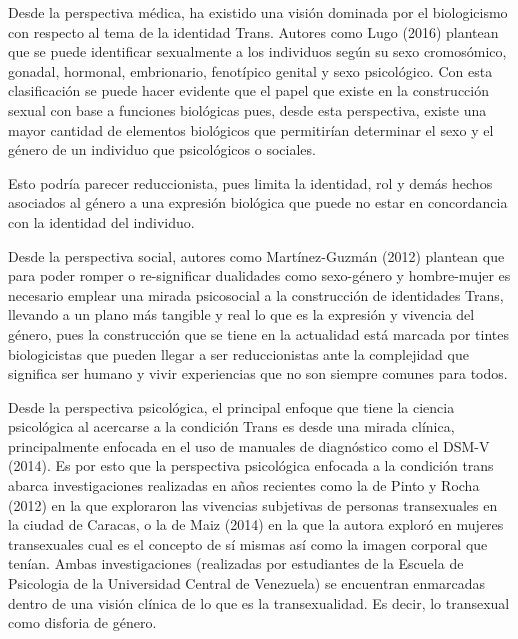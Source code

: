 Desde la perspectiva médica, ha existido una visión dominada por el
biologicismo con respecto al tema de la identidad Trans.
Autores como Lugo (2016) plantean que se puede identificar sexualmente a los
individuos según su sexo cromosómico, gonadal, hormonal, embrionario, fenotípico
genital y sexo psicológico.
Con esta clasificación se puede hacer evidente que el papel que existe en la
construcción sexual con base a funciones biológicas pues, desde esta
perspectiva, existe una mayor cantidad de elementos biológicos que
permitirían determinar el sexo y el género de un individuo que psicológicos o
sociales.

Esto podría parecer reduccionista, pues limita la identidad, rol y demás hechos
asociados al género a una expresión biológica que puede no estar en concordancia
con la identidad del individuo.

Desde la perspectiva social, autores como Martínez-Guzmán (2012) plantean que
para poder romper o re-significar dualidades como sexo-género y hombre-mujer es
necesario emplear una mirada psicosocial a la construcción de identidades Trans,
llevando a un plano más tangible y real lo que es la expresión y vivencia del
género, pues la construcción que se tiene en la actualidad está marcada por
tintes biologicistas que pueden llegar a ser reduccionistas ante la complejidad
que significa ser humano y vivir experiencias que no son siempre comunes para
todos.

Desde la perspectiva psicológica, el principal enfoque que tiene la
ciencia psicológica al acercarse a la condición Trans es desde una mirada
clínica, principalmente enfocada en el uso de manuales de diagnóstico como el
DSM-V (2014).
Es por esto que la perspectiva psicológica enfocada a la condición trans abarca
investigaciones realizadas en años recientes como la de Pinto y Rocha (2012) en
la que exploraron las vivencias subjetivas de personas transexuales en la ciudad
de Caracas, o la de Maiz (2014) en la que la autora exploró en mujeres
transexuales cual es el concepto de sí mismas así como la imagen corporal que
tenían.
Ambas investigaciones (realizadas por estudiantes de la Escuela de Psicologia de
la Universidad Central de Venezuela) se encuentran enmarcadas dentro de una
visión clínica de lo que es la transexualidad.
Es decir, lo transexual como disforia de género.

